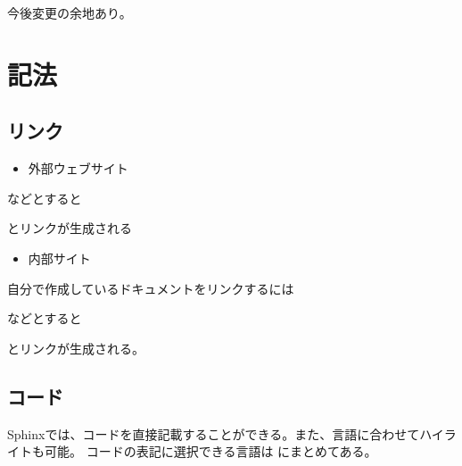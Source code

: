\documentclass[letterpaper,10pt,dvipdfmx,report]{sphinxmanual}
\begin{document}
今後変更の余地あり。


\section{記法}
\label{\detokenize{sphinx:id6}}

\subsection{リンク}
\label{\detokenize{sphinx:id7}}\begin{itemize}
\item {} 
外部ウェブサイト

\end{itemize}

\begin{sphinxVerbatim}[commandchars=\\\{\}]
\end{sphinxVerbatim}

などとすると
\begin{quote}

\end{quote}

とリンクが生成される
\begin{itemize}
\item {} 
内部サイト

\end{itemize}

自分で作成しているドキュメントをリンクするには

\begin{sphinxVerbatim}[commandchars=\\\{\}]
\end{sphinxVerbatim}

などとすると
\begin{quote}

{\hyperref[\detokenize{index::doc}]{}}
\end{quote}

とリンクが生成される。


\subsection{コード}
\label{\detokenize{sphinx:id8}}
Sphinxでは、コードを直接記載することができる。また、言語に合わせてハイライトも可能。
コードの表記に選択できる言語は  にまとめてある。
\end{document}

